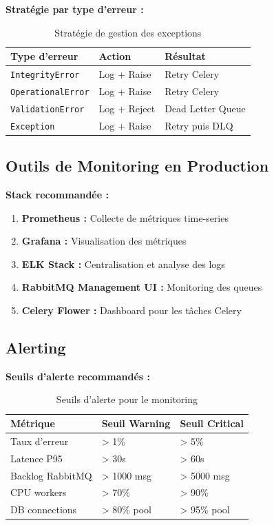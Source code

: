 \documentclass[12pt,a4paper]{article}
\begin{document}
\textbf{Stratégie par type d'erreur :}

\begin{table}[H]
\centering
\begin{tabular}{lll}
\toprule
\textbf{Type d'erreur} & \textbf{Action} & \textbf{Résultat} \\
\midrule
\texttt{IntegrityError} & Log + Raise & Retry Celery \\
\texttt{OperationalError} & Log + Raise & Retry Celery \\
\texttt{ValidationError} & Log + Reject & Dead Letter Queue \\
\texttt{Exception} & Log + Raise & Retry puis DLQ \\
\bottomrule
\end{tabular}
\caption{Stratégie de gestion des exceptions}
\end{table}

\subsection{Outils de Monitoring en Production}

\textbf{Stack recommandée :}

\begin{enumerate}
    \item \textbf{Prometheus :} Collecte de métriques time-series
    \item \textbf{Grafana :} Visualisation des métriques
    \item \textbf{ELK Stack :} Centralisation et analyse des logs
    \item \textbf{RabbitMQ Management UI :} Monitoring des queues
    \item \textbf{Celery Flower :} Dashboard pour les tâches Celery
\end{enumerate}

\subsection{Alerting}

\textbf{Seuils d'alerte recommandés :}

\begin{table}[H]
\centering
\begin{tabular}{lll}
\toprule
\textbf{Métrique} & \textbf{Seuil Warning} & \textbf{Seuil Critical} \\
\midrule
Taux d'erreur & > 1\% & > 5\% \\
Latence P95 & > 30s & > 60s \\
Backlog RabbitMQ & > 1000 msg & > 5000 msg \\
CPU workers & > 70\% & > 90\% \\
DB connections & > 80\% pool & > 95\% pool \\
\bottomrule
\end{tabular}
\caption{Seuils d'alerte pour le monitoring}
\end{table}
\end{document}
